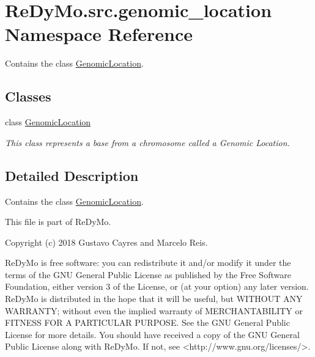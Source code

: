\hypertarget{namespaceReDyMo_1_1src_1_1genomic__location}{}\section{Re\+Dy\+Mo.\+src.\+genomic\+\_\+location Namespace Reference}
\label{namespaceReDyMo_1_1src_1_1genomic__location}


Contains the class \mbox{\hyperlink{classReDyMo_1_1src_1_1genomic__location_1_1GenomicLocation}{Genomic\+Location}}.  


\subsection*{Classes}
\begin{DoxyCompactItemize}
\item 
class \mbox{\hyperlink{classReDyMo_1_1src_1_1genomic__location_1_1GenomicLocation}{Genomic\+Location}}
\begin{DoxyCompactList}\small\item\em This class represents a base from a chromosome called a Genomic Location. \end{DoxyCompactList}\end{DoxyCompactItemize}


\subsection{Detailed Description}
Contains the class \mbox{\hyperlink{classReDyMo_1_1src_1_1genomic__location_1_1GenomicLocation}{Genomic\+Location}}. 

\begin{DoxyVerb}This file is part of ReDyMo.

    Copyright (c) 2018  Gustavo Cayres and Marcelo Reis.

    ReDyMo is free software: you can redistribute it and/or modify it
    under the terms of the GNU General Public License as published by the
    Free Software Foundation, either version 3 of the License, or (at your
    option) any later version.
    ReDyMo is distributed in the hope that it will be useful, but WITHOUT
    ANY WARRANTY; without even the implied warranty of MERCHANTABILITY or
    FITNESS FOR A PARTICULAR PURPOSE. See the GNU General Public License
    for more details.
    You should have received a copy of the GNU General Public License along
    with ReDyMo. If not, see <http://www.gnu.org/licenses/>.\end{DoxyVerb}
